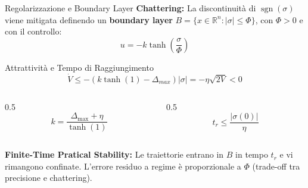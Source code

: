 \documentclass[aspectratio=169]{beamer} %
\begin{document}
\begin{frame}{Regolarizzazione e Boundary Layer}
    \textbf{Chattering:} La discontinuità di $\operatorname{sgn}(\sigma)$ viene mitigata definendo un \textbf{boundary layer} $B = \{x \in \mathbb{R}^n: |\sigma| \leq \Phi\}$, con $\Phi >  0$  e con il controllo:
    \begin{equation}
        u = -k \tanh\left( \frac{\sigma}{\Phi} \right)
    \end{equation}
    \vspace{-0.5cm}
    \begin{block}{Attrattività e Tempo di Raggiungimento}
        \begin{equation}
            \dot{V} \le - \left( k \tanh(1) - \Delta_{max} \right) |\sigma| = - \eta \sqrt{2V} < 0
        \end{equation}
        \vspace{-0.5cm}
        \begin{columns}[c]
            \begin{column}{0.5\textwidth}
                \centering
                \begin{equation}
                    k = \frac{\Delta_{\max} + \eta}{\tanh(1)}
                \end{equation}
            \end{column}
            \begin{column}{0.5\textwidth}
                \centering
                \begin{equation}
                    t_r \le \frac{|\sigma(0)|}{\eta}
                \end{equation}
            \end{column}
        \end{columns}
    \end{block}

    \vspace{0.2cm}

    \textbf{Finite-Time Pratical Stability:} Le traiettorie entrano in $B$ in tempo $t_r$ e vi rimangono confinate. L'errore residuo a regime è proporzionale a $\Phi$ (trade-off tra precisione e chattering).
\end{frame}
\end{document}
